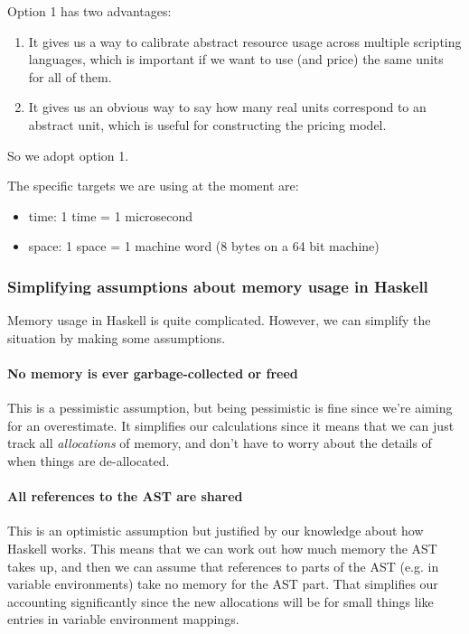 Option 1 has two advantages:
\begin{enumerate}
\item It gives us a way to calibrate abstract resource usage across multiple scripting languages, which is important if we want to use (and price) the same units for all of them.
\item It gives us an obvious way to say how many real units correspond to an abstract unit, which is useful for constructing the pricing model.
\end{enumerate}

So we adopt option 1.

The specific targets we are using at the moment are:
\begin{itemize}
\item \gls{time}: 1 \gls{time} = 1 microsecond
\item \gls{space}: 1 \gls{space} = 1 machine word (8 bytes on a 64 bit machine)
\end{itemize}

\subsubsection{Simplifying assumptions about memory usage in Haskell}
Memory usage in Haskell is quite complicated.
However, we can simplify the situation by making some assumptions.

\paragraph{No memory is ever garbage-collected or freed}
This is a pessimistic assumption, but being pessimistic is fine since we're aiming for an overestimate.
It simplifies our calculations since it means that we can just track all \emph{allocations} of memory, and don't have to worry about the details of when things are de-allocated.

\paragraph{All references to the AST are shared}
This is an optimistic assumption but justified by our knowledge about how Haskell works.
This means that we can work out how much memory the AST takes up, and then we can assume that references to parts of the AST (e.g. in variable environments) take no memory for the AST part.
That simplifies our accounting significantly since the new allocations will be for small things like entries in variable environment mappings.

